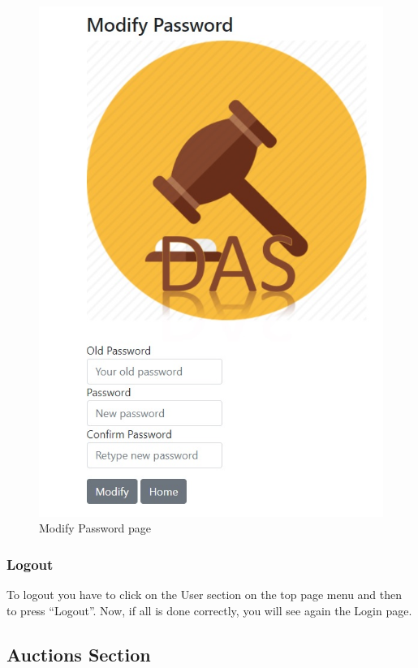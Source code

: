 \begin{figure}[htb]
	\centering
	\includegraphics[width=\textwidth]{img/modify.jpg}
	\caption{Modify Password page}\label{fig:modify}
\end{figure}

\subsubsection{Logout}

To logout you have to click on the User section on the top page menu and then to
press ``Logout''. Now, if all is done correctly, you will see again the Login
page.

\subsection{Auctions Section}

